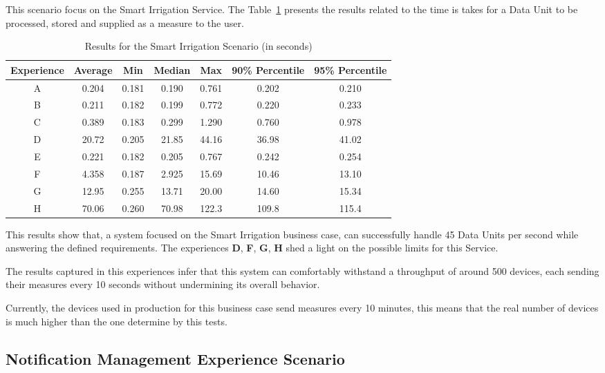 This scenario focus on the Smart Irrigation Service. The Table~\ref{tab:evaluation:experiences:irrigation:results} presents the results related to the time is takes for a Data Unit to be processed, stored and supplied as a measure to the user.

\begin{table}[H]
    \centering
    \begin{tabular}{@{}ccccccc@{}}
    \toprule
    \textbf{Experience} & \textbf{Average} & \textbf{Min} & \textbf{Median} & \textbf{Max} & \textbf{90\% Percentile} & \textbf{95\% Percentile} \\ \midrule
    A & 0.204 & 0.181 & 0.190 & 0.761 & 0.202 & 0.210 \\ \midrule
    B & 0.211 & 0.182 & 0.199 & 0.772 & 0.220 & 0.233 \\ \midrule
    C & 0.389 & 0.183 & 0.299 & 1.290 & 0.760 & 0.978 \\ \midrule
    D & 20.72 & 0.205 & 21.85 & 44.16 & 36.98 & 41.02 \\ \midrule
    E & 0.221 & 0.182 & 0.205 & 0.767 & 0.242 & 0.254 \\ \midrule
    F & 4.358 & 0.187 & 2.925 & 15.69 & 10.46 & 13.10 \\ \midrule
    G & 12.95 & 0.255 & 13.71 & 20.00 & 14.60 & 15.34 \\ \midrule
    H & 70.06 & 0.260 & 70.98 & 122.3 & 109.8 & 115.4 \\ \bottomrule
    \end{tabular}
    \caption{Results for the Smart Irrigation Scenario (in seconds)}
    \label{tab:evaluation:experiences:irrigation:results}
\end{table}

This results show that, a system focused on the Smart Irrigation business case, can successfully handle 45 Data Units per second while answering the defined requirements. The experiences \textbf{D}, \textbf{F}, \textbf{G}, \textbf{H} shed a light on the possible limits for this Service. 

The results captured in this experiences infer that this system can comfortably withstand a throughput of around 500 devices, each sending their measures every 10 seconds without undermining its overall behavior.

Currently, the devices used in production for this business case send measures every 10 minutes, this means that the real number of devices is much higher than the one determine by this tests.

\subsection{Notification Management Experience Scenario}
\label{subsec:evaluation:experiences:notification}

